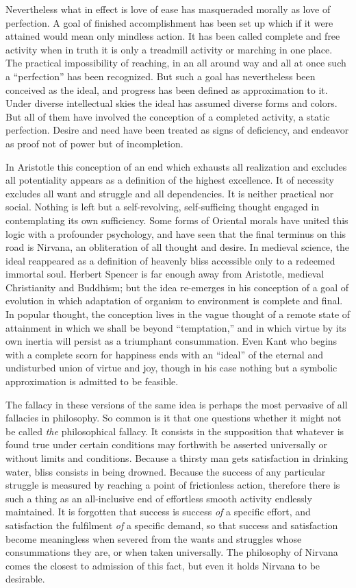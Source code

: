 \documentclass[12pt]{article}
\begin{document}
Nevertheless what in effect is love of ease has masqueraded
morally as love of perfection. A goal of finished
accomplishment has been set up which if it were
attained would mean only mindless action. It has been
called complete and free activity when in truth it is
only a treadmill activity or marching in one place. The
practical impossibility of reaching, in an all around
way and all at once such a ``perfection'' has been recognized.
But such a goal has nevertheless been conceived
as the ideal, and progress has been defined as
approximation to it. Under diverse intellectual skies
the ideal has assumed diverse forms and colors. But
all of them have involved the conception of a completed
activity, a static perfection. Desire and need have been
treated as signs of deficiency, and endeavor as proof
not of power but of incompletion.

In Aristotle this conception of an end which exhausts
all realization and excludes all potentiality appears
as a definition of the highest excellence. It of
necessity excludes all want and struggle and all dependencies.
It is neither practical nor social. Nothing
is left but a self-revolving, self-sufficing thought
engaged in contemplating its own sufficiency. Some
forms of Oriental morals have united this logic with a
profounder psychology, and have seen that the final
terminus on this road is Nirvana, an obliteration of
all thought and desire. In medieval science, the ideal
reappeared as a definition of heavenly bliss accessible
only to a redeemed immortal soul. Herbert Spencer
is far enough away from Aristotle, medieval Christianity
and Buddhism; but the idea re-emerges in his conception
of a goal of evolution in which adaptation of
organism to environment is complete and final. In
popular thought, the conception lives in the vague
thought of a remote state of attainment in which we
shall be beyond ``temptation,'' and in which virtue
by its own inertia will persist as a triumphant consummation.
Even Kant who begins with a complete scorn
for happiness ends with an ``ideal'' of the eternal and
undisturbed union of virtue and joy, though in his
case nothing but a symbolic approximation is admitted
to be feasible.

The fallacy in these versions of the same idea is
perhaps the most pervasive of all fallacies in philosophy.
So common is it that one questions whether it
might not be called \emph{the} philosophical fallacy. It consists
in the supposition that whatever is found true
under certain conditions may forthwith be asserted universally
or without limits and conditions. Because a
thirsty man gets satisfaction in drinking water, bliss
consists in being drowned. Because the success of any
particular struggle is measured by reaching a point of
frictionless action, therefore there is such a thing as an
all-inclusive end of effortless smooth activity endlessly
maintained. It is forgotten that success is success \emph{of}
a specific effort, and satisfaction the fulfilment \emph{of} a
specific demand, so that success and satisfaction become
meaningless when severed from the wants and
struggles whose consummations they are, or when
taken universally. The philosophy of Nirvana comes
the closest to admission of this fact, but even it holds
Nirvana to be desirable.
\end{document}
